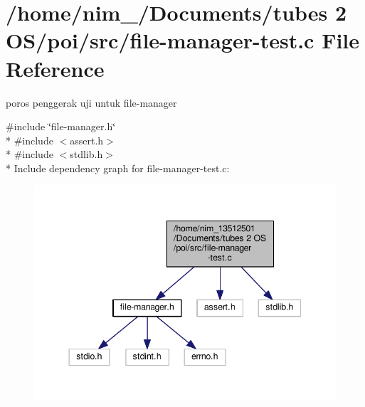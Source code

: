 \hypertarget{file-manager-test_8c}{\section{/home/nim\-\_/\-Documents/tubes 2 O\-S/poi/src/file-\/manager-\/test.c File Reference}
\label{file-manager-test_8c}
}


poros penggerak uji untuk file-\/manager  


{\ttfamily \#include \char`\"{}file-\/manager.\-h\char`\"{}}\\*
{\ttfamily \#include $<$assert.\-h$>$}\\*
{\ttfamily \#include $<$stdlib.\-h$>$}\\*
Include dependency graph for file-\/manager-\/test.c\-:\nopagebreak
\begin{figure}[H]
\begin{center}
\leavevmode
\includegraphics[width=344pt]{file-manager-test_8c__incl}
\end{center}
\end{figure}
